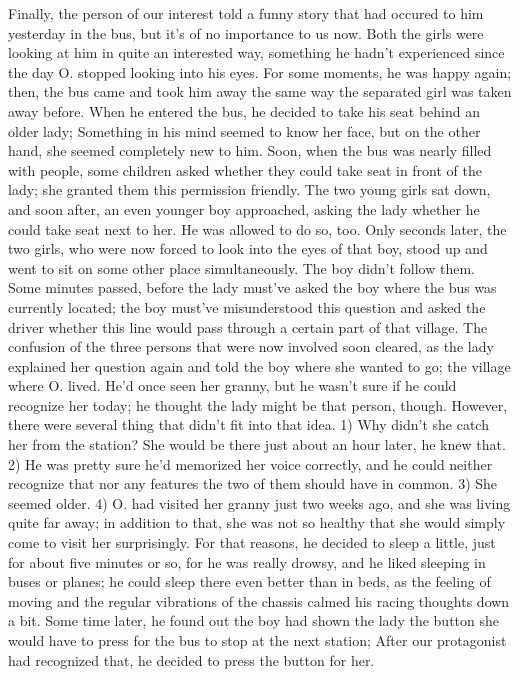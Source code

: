 Finally, the person of our interest told a funny story that had occured to him yesterday in the bus, but it's of no importance to us now. 
Both the girls were looking at him in quite an interested way, something he hadn't experienced since the day O. stopped looking into his eyes. 
For some moments, he was happy again; then, the bus came and took him away the same way the separated girl was taken away before. 
When he entered the bus, he decided to take his seat behind an older lady; Something in his mind seemed to know her face, but on the other hand, she seemed completely new to him. 
Soon, when the bus was nearly filled with people, some children asked whether they could take seat in front of the lady; she granted them this permission friendly. 
The two young girls sat down, and soon after, an even younger boy approached, asking the lady whether he could take seat next to her. 
He was allowed to do so, too. 
Only seconds later, the two girls, who were now forced to look into the eyes of that boy, stood up and went to sit on some other place simultaneously. 
The boy didn't follow them. 
Some minutes passed, before the lady must've asked the boy where the bus was currently located; the boy must've misunderstood this question and asked the driver whether this line would pass through a certain part of that village. 
The confusion of the three persons that were now involved soon cleared, as the lady explained her question again and told the boy where she wanted to go; the village where O. lived. 
He'd once seen her granny, but he wasn't sure if he could recognize her today; he thought the lady might be that person, though. 
However, there were several thing that didn't fit into that idea. 
1) Why didn't she catch her from the station? She would be there just about an hour later, he knew that. 
2) He was pretty sure he'd memorized her voice correctly, and he could neither recognize that nor any features the two of them should have in common. 
3) She seemed older. 
4) O. had visited her granny just two weeks ago, and she was living quite far away; in addition to that, she was not so healthy that she would simply come to visit her surprisingly. 
For that reasons, he decided to sleep a little, just for about five minutes or so, for he was really drowsy, and he liked sleeping in buses or planes; he could sleep there even better than in beds, as the feeling of moving and the regular vibrations of the chassis calmed his racing thoughts down a bit. 
Some time later, he found out the boy had shown the lady the button she would have to press for the bus to stop at the next station; After our protagonist had recognized that, he decided to press the button for her. 
